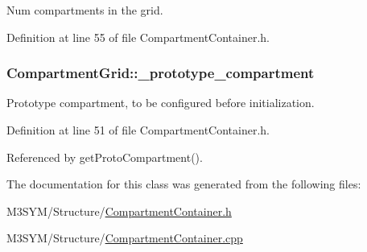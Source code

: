 Num compartments in the grid. 



Definition at line 55 of file Compartment\+Container.\+h.

\hypertarget{classCompartmentGrid_a0dd5ebffc52820b92a932335048a11a7}{
\subsubsection[{\+\_\+prototype\+\_\+compartment}]{ Compartment\+Grid\+::\+\_\+prototype\+\_\+compartment\hspace{0.3cm}{\ttfamily [private]}}}\label{classCompartmentGrid_a0dd5ebffc52820b92a932335048a11a7}


Prototype compartment, to be configured before initialization. 



Definition at line 51 of file Compartment\+Container.\+h.



Referenced by get\+Proto\+Compartment().



The documentation for this class was generated from the following files\+:\begin{DoxyCompactItemize}
\item 
M3\+S\+Y\+M/\+Structure/\hyperlink{CompartmentContainer_8h}{Compartment\+Container.\+h}\item 
M3\+S\+Y\+M/\+Structure/\hyperlink{CompartmentContainer_8cpp}{Compartment\+Container.\+cpp}\end{DoxyCompactItemize}
